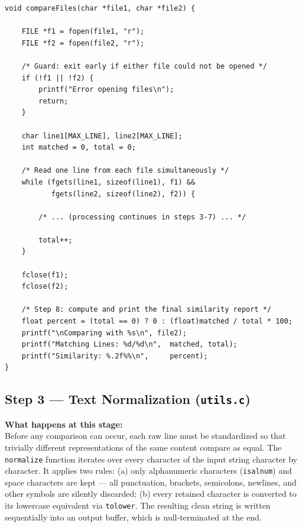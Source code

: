 \documentclass[12pt,a4paper]{article}
\begin{document}
\begin{lstlisting}[caption={\texttt{compare.c} -- File opening and simultaneous line reading}]
void compareFiles(char *file1, char *file2) {

    FILE *f1 = fopen(file1, "r");
    FILE *f2 = fopen(file2, "r");

    /* Guard: exit early if either file could not be opened */
    if (!f1 || !f2) {
        printf("Error opening files\n");
        return;
    }

    char line1[MAX_LINE], line2[MAX_LINE];
    int matched = 0, total = 0;

    /* Read one line from each file simultaneously */
    while (fgets(line1, sizeof(line1), f1) &&
           fgets(line2, sizeof(line2), f2)) {

        /* ... (processing continues in steps 3-7) ... */

        total++;
    }

    fclose(f1);
    fclose(f2);

    /* Step 8: compute and print the final similarity report */
    float percent = (total == 0) ? 0 : (float)matched / total * 100;
    printf("\nComparing with %s\n", file2);
    printf("Matching Lines: %d/%d\n",  matched, total);
    printf("Similarity: %.2f%%\n",     percent);
}
\end{lstlisting}

\newpage

\subsection{Step 3 — Text Normalization (\texttt{utils.c})}

\textbf{What happens at this stage:}\\
Before any comparison can occur, each raw line must be standardized so that trivially different representations of the same content compare as equal. The \texttt{normalize} function iterates over every character of the input string character by character. It applies two rules: (a) only alphanumeric characters (\texttt{isalnum}) and space characters are kept — all punctuation, brackets, semicolons, newlines, and other symbols are silently discarded; (b) every retained character is converted to its lowercase equivalent via \texttt{tolower}. The resulting clean string is written sequentially into an output buffer, which is null-terminated at the end.
\end{document}

